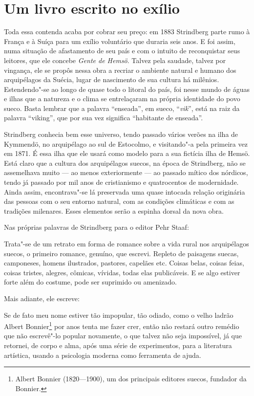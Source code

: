 \medskip
\section{Um livro escrito no exílio}

Toda essa contenda acaba por cobrar seu preço: em 1883 Strindberg parte rumo 
à França e à Suíça para um exílio voluntário que duraria seis anos. E foi assim, numa
situação de afastamento de seu país e com o intuito de reconquistar
seus leitores, que ele concebe \textit{Gente de Hemsö}. Talvez pela saudade,
talvez por vingança, ele se propôs nessa obra a recriar o ambiente natural e
humano dos arquipélagos da Suécia, lugar de nascimento de sua cultura
há milênios. Estendendo"-se ao longo de quase todo o litoral do
país, foi nesse mundo de águas e ilhas que a natureza e o clima se
entrelaçaram na própria identidade do povo sueco. Basta lembrar que a
palavra “enseada”, em sueco, “\textit{vik}”, está na raiz da palavra “viking”,
que por sua vez significa “habitante de enseada”. 

Strindberg conhecia bem esse universo, tendo passado vários verões na
ilha de Kymmendö, no arquipélago ao sul de Estocolmo, e visitando"-a
pela primeira vez em 1871. É essa ilha que ele usará como modelo para a
sua fictícia ilha de Hemsö. Está claro que a cultura dos arquipélagos suecos,
na época de Strindberg, não se assemelhava muito --- ao menos exteriormente ---
ao passado mítico dos nórdicos, tendo já passado por mil anos de cristianismo
e quatrocentos de modernidade.  Ainda assim, encontrava"-se lá
preservada uma quase intocada relação originária das pessoas com o seu
entorno natural, com as condições climáticas e com as tradições milenares. Esses
elementos serão a espinha dorsal da nova obra. 

Nas próprias palavras de Strindberg para o editor Pehr Staaf:

\begin{hedraquote}
Trata"-se de um retrato em forma de romance sobre a vida rural
nos arquipélagos suecos, o primeiro romance, genuíno, que escrevi.
Repleto de paisagens suecas, camponeses, homens ilustrados, pastores,
capelães etc. Coisas belas, coisas feias, coisas tristes, alegres,
cômicas, vívidas, todas elas publicáveis. E se algo estiver forte além
do costume, pode ser suprimido ou amenizado.
\end{hedraquote}

Mais adiante, ele escreve:

\begin{hedraquote}
Se de fato meu nome estiver tão impopular, tão odiado, como o
velho ladrão Albert Bonnier\footnote{ Albert Bonnier (1820---1900), um 
dos principais editores suecos, fundador da Bonnier.} por anos tenta me fazer crer, então não restará outro
remédio que não escrevê"-lo popular novamente, o que talvez não seja  %
impossível, já que retornei, de corpo e alma, após uma série de
experimentos, para a literatura artística, usando a psicologia
moderna como ferramenta de ajuda.
\end{hedraquote}

